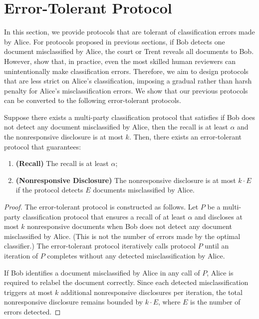 \section{Error-Tolerant Protocol}

In this section, we provide protocols that are tolerant of classification errors made by Alice. For protocols proposed in previous sections, if Bob detects one document misclassified by Alice, the court or Trent reveals all documents to Bob. 
However, \citet*{grossman2010technology,grossman2012inconsistent} show that, in practice, even the most skilled human reviewers can unintentionally make classification errors.
Therefore, we aim to design protocols that are less strict on Alice's classification, imposing a gradual rather than harsh penalty for Alice's misclassification errors.
We show that our previous protocols can be converted to the following error-tolerant protocols.

\begin{theorem}
\label{thm:error_tolerant_protocol}
    Suppose there exists a multi-party classification protocol that satisfies if Bob does not detect any document misclassified by Alice, then the recall is at least $\alpha$ and the nonresponsive disclosure is at most $k$.
    Then, there exists an error-tolerant protocol that guarantees:
    \begin{enumerate}
        \item \textbf{(Recall)} The recall is at least $\alpha$;
        \item \textbf{(Nonresponsive Disclosure)} The nonresponsive disclosure is at most $k\cdot E$ if the protocol detects $E$ documents misclassified by Alice.
    \end{enumerate}
\end{theorem}

\begin{proof}
    The error-tolerant protocol is constructed as follows. Let $P$ be a multi-party classification protocol that ensures a recall of at least $\alpha$ and discloses at most $k$ nonresponsive documents when Bob does not detect any document misclassified by Alice. (This is not the number of errors made by the optimal classifier.)
    The error-tolerant protocol iteratively calls protocol $P$ until an iteration of $P$ completes without any detected misclassification by Alice.
    
    If Bob identifies a document misclassified by Alice in any call of $P$, Alice is required to relabel the document correctly. 
    Since each detected misclassification triggers at most $k$ additional nonresponsive disclosures per iteration, the total nonresponsive disclosure remains bounded by $k \cdot E$, where $E$ is the number of errors detected.
\end{proof}

